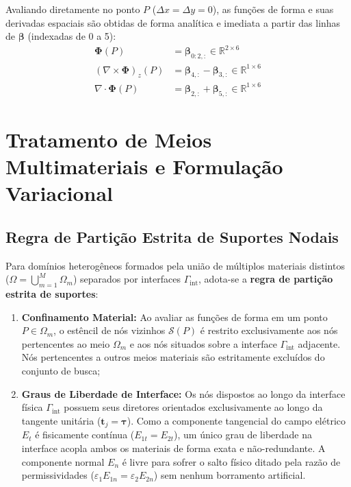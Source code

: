 \documentclass[11pt,a4paper]{article}
\begin{document}
Avaliando diretamente no ponto $P$ ($\Delta x = \Delta y = 0$), as fun\c{c}\~oes de forma e suas derivadas espaciais s\~ao obtidas de forma anal\'itica e imediata a partir das linhas de $\boldsymbol{\beta}$ (indexadas de 0 a 5):
\begin{align}
\boldsymbol{\Phi}(P) &= \boldsymbol{\beta}_{0:2, :} \in \mathbb{R}^{2 \times 6} \\
(\nabla \times \boldsymbol{\Phi})_z(P) &= \boldsymbol{\beta}_{4, :} - \boldsymbol{\beta}_{3, :} \in \mathbb{R}^{1 \times 6} \\
\nabla \cdot \boldsymbol{\Phi}(P) &= \boldsymbol{\beta}_{2, :} + \boldsymbol{\beta}_{5, :} \in \mathbb{R}^{1 \times 6}
\end{align}

\section{Tratamento de Meios Multimateriais e Formula\c{c}\~ao Variacional}

\subsection{Regra de Parti\c{c}\~ao Estrita de Suportes Nodais}
Para dom\'inios heterog\^eneos formados pela uni\~ao de m\'ultiplos materiais distintos ($\Omega = \bigcup_{m=1}^M \Omega_m$) separados por interfaces $\Gamma_{\mathrm{int}}$, adota-se a \textbf{regra de parti\c{c}\~ao estrita de suportes}:
\begin{enumerate}
  \item \textbf{Confinamento Material:} Ao avaliar as fun\c{c}\~oes de forma em um ponto $P \in \Omega_m$, o est\^encil de n\'os vizinhos $\mathcal{S}(P)$ \'e restrito exclusivamente aos n\'os pertencentes ao meio $\Omega_m$ e aos n\'os situados sobre a interface $\Gamma_{\mathrm{int}}$ adjacente. N\'os pertencentes a outros meios materiais s\~ao estritamente exclu\'idos do conjunto de busca;
  \item \textbf{Graus de Liberdade de Interface:} Os n\'os dispostos ao longo da interface f\'isica $\Gamma_{\mathrm{int}}$ possuem seus diretores orientados exclusivamente ao longo da tangente unit\'aria ($\mathbf{t}_j = \boldsymbol{\tau}$). Como a componente tangencial do campo el\'etrico $E_t$ \'e fisicamente cont\'inua ($E_{1t} = E_{2t}$), um \'unico grau de liberdade na interface acopla ambos os materiais de forma exata e n\~ao-redundante. A componente normal $E_n$ \'e livre para sofrer o salto f\'isico ditado pela raz\~ao de permissividades ($\varepsilon_1 E_{1n} = \varepsilon_2 E_{2n}$) sem nenhum borramento artificial.
\end{enumerate}
\end{document}
